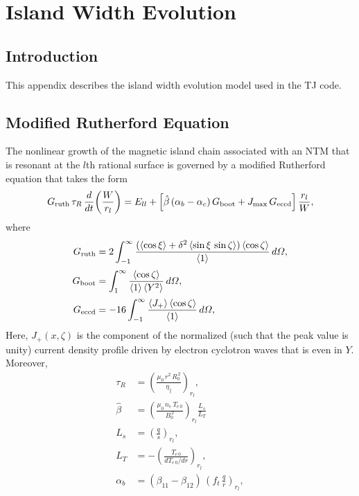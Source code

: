 \documentclass{iopjournal}
\begin{document}
{\section{Island Width Evolution}\label{wevol}
\subsection{Introduction}
This appendix describes the island width evolution model used in the TJ code. 

\subsection{Modified Rutherford Equation}
The nonlinear growth of the magnetic island  chain associated with an NTM that is resonant at the $l$th rational surface is governed by a modified Rutherford equation that takes the
 form \cite{ntm1,ntm4,island,boot,fitz}
\begin{equation}\label{eruth}
G_{\rm ruth}\,\tau_R\,\frac{d}{dt}\!\left(\frac{W}{r_l}\right) = E_{ll} +\left[\hat{\beta}\,(\alpha_b-\alpha_c)\,G_{\rm boot} + J_{\rm max}\,G_{\rm eccd}\right]
\frac{r_l}{W},
\end{equation}
where
\begin{align}
G_{\rm ruth} &= 2\int_{-1}^\infty \frac{(\langle\cos\xi\rangle + \delta^2\,\langle \sin\xi\,\sin\zeta\rangle)\,\langle \cos\zeta\rangle}{\langle 1\rangle}\,d{\mit\Omega},\\[0.5ex]
G_{\rm boot} &= \int_1^\infty \frac{\langle \cos\zeta\rangle}{\langle 1\rangle\,\langle Y^2\rangle}\,d{\mit\Omega},\\[0.5ex]
G_{\rm eccd} &= - 16\int_{-1}^\infty \frac{\langle J_+\rangle\,\langle \cos\zeta\rangle}{\langle 1\rangle}\,d{\mit\Omega},\label{geccd}
\end{align}
Here,  $J_+(x,\zeta)$ is the component of the normalized  (such that the peak value is unity) current density profile driven by electron cyclotron waves that is even in $Y$. 
Moreover, 
\begin{align}
\tau_R &= \left(\frac{\mu_0\,r^2\,R_0^{\,2}}{\eta_\parallel}\right)_{r_l},\\[0.5ex]
\hat{\beta} &= \left(\frac{\mu_0\,n_e\,T_{e\,0}}{B_0^{\,2}}\right)_{r_l}\frac{L_s}{L_T}\,\\[0.5ex]
L_s&=\left(\frac{q}{s}\right)_{r_l},\\[0.5ex]
L_T &= -\left(\frac{T_{e\,0}}{dT_{e\,0}/dr}\right)_{r_l},\\[0.5ex]
\alpha_b &=(\beta_{11}-\beta_{12})\, \left(f_t\,\frac{q}{r}\right)_{r_l},\\[0.5ex]

\end{align}}
\end{document}

